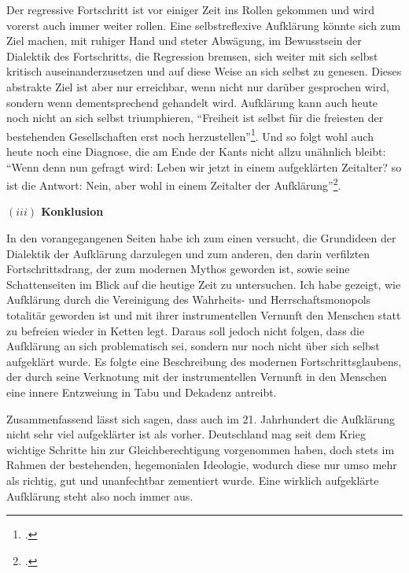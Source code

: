 \documentclass[a4paper, 12pt]{article}
\begin{document}
\begin{onehalfspace}
Der regressive Fortschritt ist vor einiger Zeit ins Rollen gekommen und wird vorerst auch immer weiter rollen. Eine selbstreflexive Aufklärung könnte sich zum Ziel machen, mit ruhiger Hand und steter Abwägung, im Bewusstsein der Dialektik des Fortschritts, die Regression bremsen, sich weiter mit sich selbst kritisch auseinanderzusetzen und auf diese Weise an sich selbst zu genesen. Dieses abstrakte Ziel ist aber nur erreichbar, wenn nicht nur darüber gesprochen wird, sondern wenn dementsprechend gehandelt wird. Aufklärung kann auch heute noch nicht an sich selbst triumphieren, "`Freiheit ist selbst für die freiesten der bestehenden Gesellschaften erst noch herzustellen"'\footnote{\Cite[Siehe][S. 98]{marcuse}.}. Und so folgt wohl auch heute noch eine Diagnose, die am Ende der Kants nicht allzu unähnlich bleibt: "`Wenn denn nun gefragt wird: Leben wir jetzt in einem aufgeklärten Zeitalter? so ist die Antwort: Nein, aber wohl in einem Zeitalter der Aufklärung"'\footnote{\Cite[Siehe][S. 491]{kant}.}.

\vspace{5mm}

\noindent\textbf{$(iii)$ Konklusion}

\noindent In den vorangegangenen Seiten habe ich zum einen versucht, die Grundideen der Dialektik der Aufklärung darzulegen und zum anderen, den darin verfilzten Fortschrittsdrang, der zum modernen Mythos geworden ist, sowie seine Schattenseiten im Blick auf die heutige Zeit zu untersuchen. Ich habe gezeigt, wie Aufklärung durch die Vereinigung des Wahrheits- und Herrschaftsmonopols totalitär geworden ist und mit ihrer instrumentellen Vernunft den Menschen statt zu befreien wieder in Ketten legt. Daraus soll jedoch nicht folgen, dass die Aufklärung an sich problematisch sei, sondern nur noch nicht über sich selbst aufgeklärt wurde. Es folgte eine Beschreibung des modernen Fortschrittsglaubens, der durch seine Verknotung mit der instrumentellen Vernunft in den Menschen eine innere Entzweiung in Tabu und Dekadenz antreibt. 

Zusammenfassend lässt sich sagen, dass auch im 21. Jahrhundert die Aufklärung nicht sehr viel aufgeklärter ist als vorher. Deutschland mag seit dem Krieg wichtige Schritte hin zur Gleichberechtigung vorgenommen haben, doch stets im Rahmen der bestehenden, hegemonialen Ideologie, wodurch diese nur umso mehr als richtig, gut und unanfechtbar zementiert wurde. Eine wirklich aufgeklärte Aufklärung steht also noch immer aus.



\end{onehalfspace}
\end{document}
